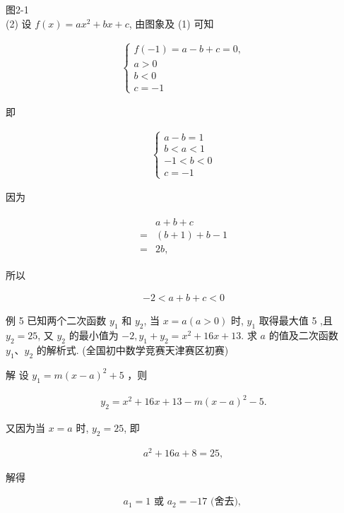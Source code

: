 \documentclass[10pt]{article}
\begin{document}
图2-1\\
(2) 设 $f(x)=a x^{2}+b x+c$, 由图象及 (1) 可知

\begin{align*}
\left\{\begin{array}{l}
f(-1)=a-b+c=0, \\
a>0 \\
b<0 \\
c=-1
\end{array}\right.
\end{align*}

即

\begin{align*}
\left\{\begin{array}{l}
a-b=1 \\
b<a<1 \\
-1<b<0 \\
c=-1
\end{array}\right.
\end{align*}

因为

\begin{align*}
\begin{aligned}
& a+b+c \\
= & (b+1)+b-1 \\
= & 2 b,
\end{aligned}
\end{align*}

所以

\begin{align*}
-2<a+b+c<0
\end{align*}

例 5 已知两个二次函数 $y_{1}$ 和 $y_{2}$, 当 $x=a(a>0)$ 时, $y_{1}$ 取得最大值 5 ,且 $y_{2}=25$, 又 $y_{2}$ 的最小值为 $-2, y_{1}+y_{2}=x^{2}+16 x+13$. 求 $a$ 的值及二次函数 $y_{1} 、 y_{2}$ 的解析式. (全国初中数学竞赛天津赛区初赛)

解 设 $y_{1}=m(x-a)^{2}+5$ ，则

\begin{align*}
y_{2}=x^{2}+16 x+13-m(x-a)^{2}-5 .
\end{align*}

又因为当 $x=a$ 时, $y_{2}=25$, 即

\begin{align*}
a^{2}+16 a+8=25,
\end{align*}

解得

\begin{align*}
a_{1}=1 \text { 或 } a_{2}=-17 \text { (舍去), }
\end{align*}
\end{document}
